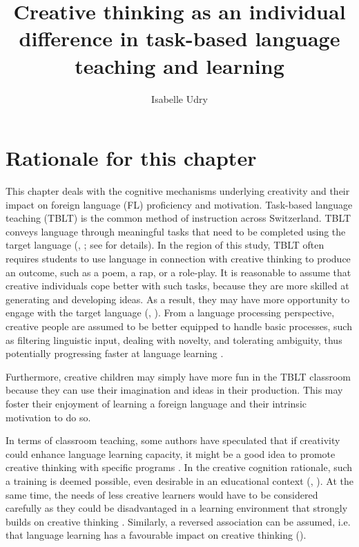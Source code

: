 \documentclass[output=paper]{langsci/langscibook}
\author{Isabelle Udry\orcid{}\affiliation{University of Fribourg, Institut de Plurilinguisme; Zurich University of Teacher Education}}
\title[Creative thinking in task-based language teaching]
      {Creative thinking as an individual difference in task-based language teaching and learning}
\begin{document}
\maketitle 

\section{Rationale for this chapter}\label{sec:06:1}

This chapter deals with the cognitive mechanisms underlying creativity and their impact on foreign language (FL) proficiency and motivation. Task-based language teaching (TBLT) is the common method of instruction across Switzerland. TBLT conveys language through meaningful tasks that need to be completed using the target language (\citealt{Willis1996}, \citealt{Ellis2017}; see  for details). In the region of this study, TBLT often requires students to use language in connection with creative thinking to produce an outcome, such as a poem, a rap, or a role-play. It is reasonable to assume that creative individuals cope better with such tasks, because they are more skilled at generating and developing ideas. As a result, they may have more opportunity to engage with the target language (\citealt{Otto1998}, \citealt{Albert2006}). From a language processing perspective, creative people are assumed to be better equipped to handle basic processes, such as filtering linguistic input, dealing with novelty, and tolerating ambiguity, thus potentially progressing faster at language learning \citep{Kharkhurin2012}. 

Furthermore, creative children may simply have more fun in the TBLT classroom because they can use their imagination and ideas in their production. This may foster their enjoyment of learning a foreign language and their intrinsic motivation to do so.

In terms of classroom teaching, some authors have speculated that if creativity could enhance language learning capacity, it might be a good idea to promote creative thinking with specific programs \citep{Kharkhurin2012}. In the creative cognition rationale, such a training is deemed possible, even desirable in an educational context (\citealt{FinkeEtAl1992}, \citealt{Vogt2010}). At the same time, the needs of less creative learners would have to be considered carefully as they could be disadvantaged in a learning environment that strongly builds on creative thinking \citep{Otto1998}. Similarly, a reversed association can be assumed, i.e. that language learning has a favourable impact on creative thinking (\citealt{GhonsoolyShowqi2012}). 
\end{document}
